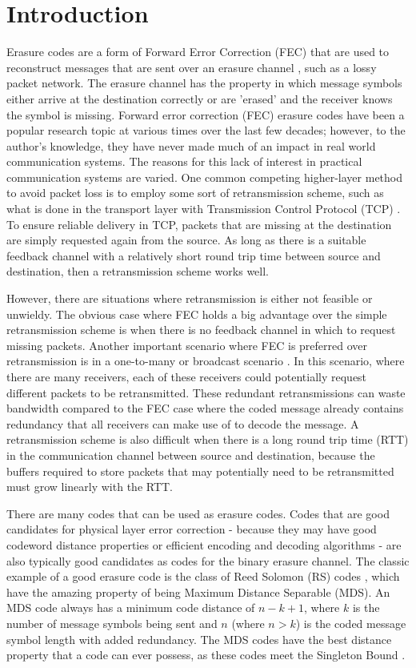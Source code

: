 \documentclass[conference]{IEEEtran}
\begin{document}
\section{Introduction}
Erasure codes are a form of Forward Error Correction (FEC) that are used to reconstruct messages that are sent over an erasure channel \cite{CovTho91}, such as a lossy packet network.  The erasure channel has the property in which message symbols either arrive at the destination correctly or are 'erased' and the receiver knows the symbol is missing.  Forward error correction (FEC) erasure codes have been a popular research topic at various times over the last few decades; however, to the author's knowledge, they have never made much of an impact in real world communication systems.  The reasons for this lack of interest in practical communication systems are varied.  One common competing higher-layer method to avoid packet loss is to employ some sort of retransmission scheme, such as what is done in the transport layer with Transmission Control Protocol (TCP) \cite{cerf-74}.  To ensure reliable delivery in TCP, packets that are missing at the destination are simply requested again from the source.  As long as there is a suitable feedback channel with a relatively short round trip time between source and destination, then a retransmission scheme works well.  

However, there are situations where retransmission is either not feasible or unwieldy.  The obvious case where FEC holds a big advantage over the simple retransmission scheme is when there is no feedback channel in which to request missing packets.  Another important scenario where FEC is preferred over retransmission is in a one-to-many or broadcast scenario \cite{luby-07}.  In this scenario, where there are many receivers, each of these receivers could potentially request different packets to be retransmitted.  These redundant retransmissions can waste bandwidth compared to the FEC case where the coded message already contains redundancy that all receivers can make use of to decode the message.  A retransmission scheme is also difficult when there is a long round trip time (RTT) in the communication channel between source and destination, because the buffers required to store packets that may potentially need to be retransmitted must grow linearly with the RTT.

There are many codes that can be used as erasure codes.  Codes that are good candidates for physical layer error correction - because they may have good codeword distance properties or efficient encoding and decoding algorithms - are also typically good candidates as codes for the binary erasure channel.  The classic example of a good erasure code is the class of Reed Solomon (RS) codes \cite{reed-1960}, which have the amazing property of being Maximum Distance Separable (MDS).  An MDS code always has a minimum code distance of $n-k+1$, where $k$ is the number of message symbols being sent and $n$ (where $n > k$) is the coded message symbol length with added redundancy.  The MDS codes have the best distance property that a code can ever possess, as these codes meet the Singleton Bound \cite{Singleton-64}.  
\end{document}
